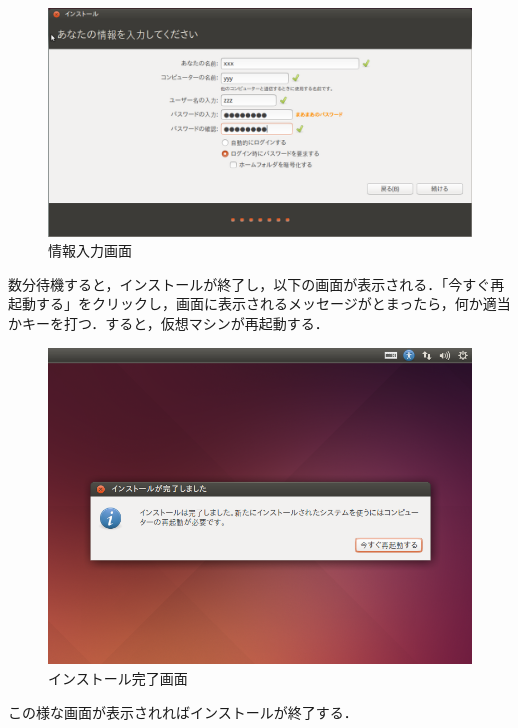 \begin{figure}[H]
\centering
\includegraphics[width=15cm]{ubuntuinstall05.png}
\caption{情報入力画面}\label{情報入力画面}
\end{figure}


数分待機すると，インストールが終了し，以下の画面が表示される．「今すぐ再起動する」をクリックし，画面に表示されるメッセージがとまったら，何か適当かキーを打つ．すると，仮想マシンが再起動する．


\begin{figure}[H]
\centering
\includegraphics[width=15cm]{ubuntuinstall06.png}
\caption{インストール完了画面}\label{イメージ画面}
\end{figure}

この様な画面が表示されればインストールが終了する．



